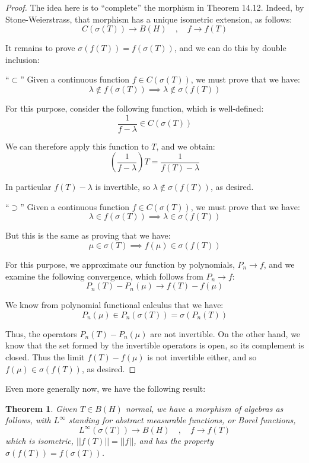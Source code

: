 \documentclass[12pt]{amsbook}
\newtheorem{theorem}{Theorem}[chapter]
\begin{document}
\begin{proof}
The idea here is to ``complete'' the morphism in Theorem 14.12. Indeed, by Stone-Weierstrass, that morphism has a unique isometric extension, as follows:
$$C(\sigma(T))\to B(H)\quad,\quad  
f\to f(T)$$

It remains to prove $\sigma(f(T))=f(\sigma(T))$, and we can do this by double inclusion:

\medskip

``$\subset$'' Given a continuous function $f\in C(\sigma(T))$, we must prove that we have:
$$\lambda\notin f(\sigma(T))\implies\lambda\notin\sigma(f(T))$$

For this purpose, consider the following function, which is well-defined:
$$\frac{1}{f-\lambda}\in C(\sigma(T))$$

We can therefore apply this function to $T$, and we obtain:
$$\left(\frac{1}{f-\lambda}\right)T=\frac{1}{f(T)-\lambda}$$

In particular $f(T)-\lambda$ is invertible, so  $\lambda\notin\sigma(f(T))$, as desired.

\medskip

``$\supset$'' Given a continuous function $f\in C(\sigma(T))$, we must prove that we have: 
$$\lambda\in f(\sigma(T))\implies\lambda\in\sigma(f(T))$$

But this is the same as proving that we have:
$$\mu\in\sigma(T)\implies f(\mu)\in\sigma(f(T))$$

For this purpose, we approximate our function by polynomials, $P_n\to f$, and we examine the following convergence, which follows from $P_n\to f$:
$$P_n(T)-P_n(\mu)\to f(T)-f(\mu)$$

We know from polynomial functional calculus that we have:
$$P_n(\mu)
\in P_n(\sigma(T))
=\sigma(P_n(T))$$

Thus, the operators $P_n(T)-P_n(\mu)$ are not invertible. On the other hand, we know that the set formed by the invertible operators is open, so its complement is closed. Thus the limit $f(T)-f(\mu)$ is not invertible either, and so $f(\mu)\in\sigma(f(T))$, as desired.
\end{proof}

Even more generally now, we have the following result:

\begin{theorem}
Given $T\in B(H)$ normal, we have a morphism of algebras as follows, with $L^\infty$ standing for abstract measurable functions, or Borel functions,
$$L^\infty(\sigma(T))\to B(H)\quad,\quad 
f\to f(T)$$
which is isometric, $||f(T)||=||f||$, and has the property $\sigma(f(T))=f(\sigma(T))$.
\end{theorem}
\end{document}
